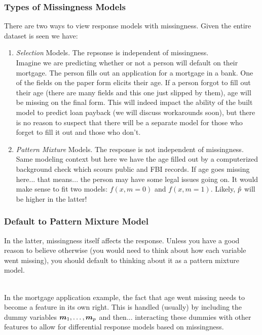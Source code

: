 \documentclass[handout]{beamer}
\begin{document}
\begin{frame}\frametitle{Types of Missingness Models}

There are two ways to view response models with missingness. Given the entire dataset is seen we have:
\begin{enumerate}
\item \emph{Selection} Models. The repsonse is independent of missingness.\\ \pause 
\footnotesize
Imagine we are predicting whether or not a person will default on their mortgage. The person fills out an application for a mortgage in a bank. One of the fields on the paper form elicits their age. If a person forgot to fill out their age (there are many fields and this one just slipped by them), age will be missing on the final form. This will indeed impact the ability of the built model to predict loan payback (we will discuss workarounds soon), but there is no reason to suspect that there will be a separate model for those who forget to fill it out and those who don't. \pause

\item \emph{Pattern Mixture} Models. The response is not independent of missingness.\\ \pause
\footnotesize
Same modeling context but here we have the age filled out by a computerized background check which scours public and FBI records. If age goes missing here... that means... \pause the person may have some legal issues going on. It would make sense to fit two models: $f(x, m = 0)$ and $f(x, m = 1)$. Likely, $\hat{p}$ will be higher in the latter!

%
\end{enumerate}


\end{frame}


\begin{frame}\frametitle{Default to Pattern Mixture Model}

In the latter, missingness itself affects the response. Unless you have a good reason to believe otherwise (you would need to think about how each variable went missing), you should default to thinking about it as a pattern mixture model.\\~\\  \pause

In the mortgage application example, the fact that age went missing needs to become a feature in its own right. \pause This is handled (usually) by including the dummy variables $\boldsymbol{m}_1, \ldots, \boldsymbol{m}_p$ and then... \pause interacting these dummies with other features to allow for differential response models based on missingness.
	
\end{frame}
\end{document}
